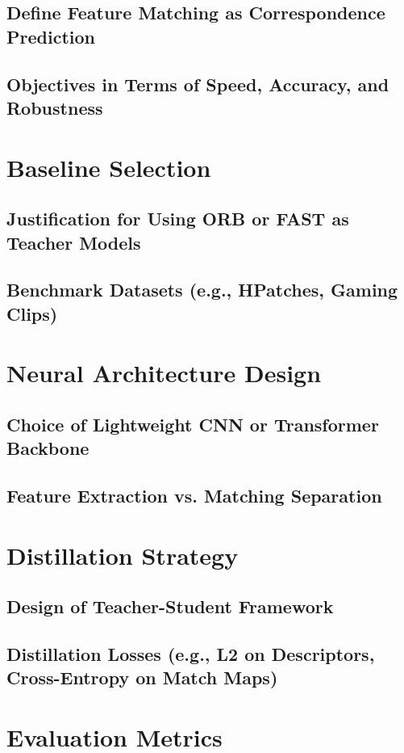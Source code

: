 \documentclass[a4paper,12pt]{report}
\begin{document}
\subsection{Define Feature Matching as Correspondence Prediction}
\subsection{Objectives in Terms of Speed, Accuracy, and Robustness}

\section{Baseline Selection}
\subsection{Justification for Using ORB or FAST as Teacher Models}
\subsection{Benchmark Datasets (e.g., HPatches, Gaming Clips)}

\section{Neural Architecture Design}
\subsection{Choice of Lightweight CNN or Transformer Backbone}
\subsection{Feature Extraction vs. Matching Separation}

\section{Distillation Strategy}
\subsection{Design of Teacher-Student Framework}
\subsection{Distillation Losses (e.g., L2 on Descriptors, Cross-Entropy on Match Maps)}

\section{Evaluation Metrics}
\end{document}
